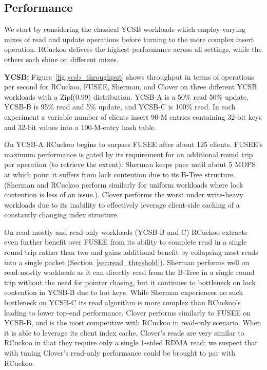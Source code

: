 


\subsection{Performance}

We start by considering the classical YCSB workloads which employ
varying mixes of read and update operations before turning to the more
complex insert operation.  RCuckoo delivers the highest performance
across all settings, while the others each shine on different
mixes.

\textbf{YCSB:}
Figure~\ref{fig:ycsb_throughput} shows throughput in terms of
operations per second for RCuckoo, FUSEE, Sherman, and Clover on
three different YCSB workloads with a Zipf(0.99) distribution. YCSB-A
is a 50\% read 50\% update, YCSB-B is 95\% read and 5\% update, and
YCSB-C is 100\% read.  In each experiment a variable number of clients
insert 90-M entries containing 32-bit keys and 32-bit values into a
100-M-entry hash table.


On YCSB-A RCuckoo begins to surpass FUSEE after about 125 clients.  FUSEE's maximum performance is gated by its requirement for an additional round trip per operation (to
retrieve the extent). Sherman keeps pace until about 5 MOPS at which
point it suffers from lock contention due to its B-Tree structure.
(Sherman and RCuckoo perform similarly for uniform workloads where
lock contention is less of an issue.).  Clover performs the worst
under write-heavy workloads due to its inability to effectively leverage
client-side caching of a constantly changing index structure.

On read-mostly and read-only workloads (YCSB-B and C)
RCuckoo extracts even further benefit over FUSEE from its ability to
complete read in a single round trip rather than two and gains
additional benefit by collapsing most reads into a single packet
(Section~\ref{sec:read_threshold}).  Sherman performs well on
read-mostly workloads as it can directly read from the B-Tree in a
single round trip without the need for pointer chasing, but it
continues to bottleneck on lock contention in YCSB-B due to hot
keys. While Sherman experiences no such bottleneck on YCSB-C its read
algorithm is more complex than RCuckoo's leading to lower top-end
performance. Clover performs similarly to FUSEE on YCSB-B, and is the
most competitive with RCuckoo in read-only scenario.  When it is able
to leverage its client index cache, Clover's reads are very similar to
RCuckoo in that they require only a single 1-sided RDMA read;  we
suspect that with tuning Clover's read-only performance
could be brought to par with RCuckoo.

